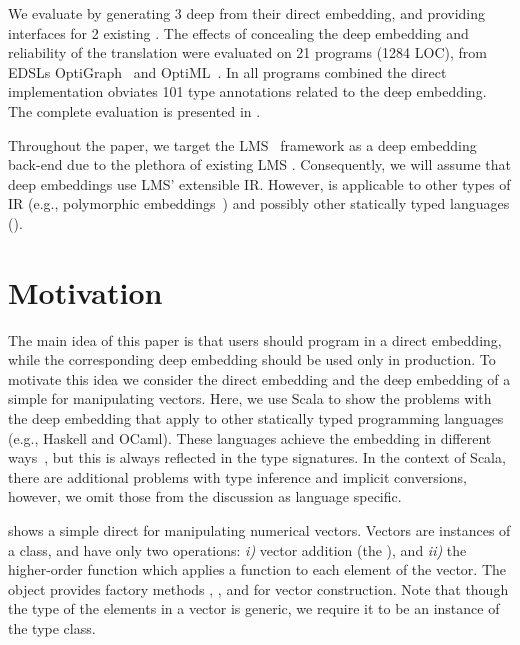 %
%
We evaluate \yy by generating 3 deep \edsls from their direct
embedding, and providing interfaces for 2 existing \edsls. The effects
of concealing the deep embedding and reliability of the translation
were evaluated on 21 programs (1284 LOC), from EDSLs
OptiGraph~\cite{composition-ecoop2013} and
OptiML~\cite{sujeeth_optiml:_2011}. In all programs combined the
direct implementation obviates 101 type annotations related to the
deep embedding. The complete evaluation is presented in
.

Throughout the paper, we target the LMS~\cite{rompf_lightweight_2012}
framework as a deep embedding back-end due to the plethora of existing
LMS \edsls.  Consequently, we will assume that deep embeddings use
LMS' extensible IR.  However, \yy is applicable to other types of IR
(e.g., polymorphic embeddings~\cite{hofer_polymorphic_2008}) and
possibly other statically typed languages ().

\section{Motivation}
\label{sec:motivation}

The main idea of this paper is that \edsl{} users should program in a
direct embedding, while the corresponding deep embedding should be used only in production.
To motivate this idea we consider the direct embedding and the deep embedding of a simple \edsl for manipulating vectors. Here, we use Scala to show the problems with the deep embedding that apply to other statically typed programming languages (e.g., Haskell and OCaml). These languages achieve the embedding in different ways~\cite{svenningsson_combining_2012,awesome,carette_finally_2009,guerrero_implementing_2004}, but this is always reflected in the type signatures. In the context of Scala, there are additional problems with type inference and implicit conversions, however, we omit those from the discussion as language specific.

 shows a simple direct \edsl{} for manipulating numerical vectors.
Vectors are instances of a  class, and have only two operations:
\emph{i)} vector addition (the \code{+}), and \emph{ii)} the higher-order  function which applies a function  to each element of the vector. The  object provides factory methods , , and  for vector construction. Note that though the type of the elements in a vector is generic, we require it to be an instance of the  type class.

